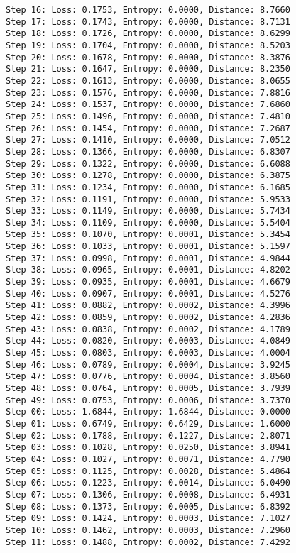 \documentclass[11pt]{article}
\begin{document}
\begin{Verbatim}[commandchars=\\\{\}]
Step 16: Loss: 0.1753, Entropy: 0.0000, Distance: 8.7660
Step 17: Loss: 0.1743, Entropy: 0.0000, Distance: 8.7131
Step 18: Loss: 0.1726, Entropy: 0.0000, Distance: 8.6299
Step 19: Loss: 0.1704, Entropy: 0.0000, Distance: 8.5203
Step 20: Loss: 0.1678, Entropy: 0.0000, Distance: 8.3876
Step 21: Loss: 0.1647, Entropy: 0.0000, Distance: 8.2350
Step 22: Loss: 0.1613, Entropy: 0.0000, Distance: 8.0655
Step 23: Loss: 0.1576, Entropy: 0.0000, Distance: 7.8816
Step 24: Loss: 0.1537, Entropy: 0.0000, Distance: 7.6860
Step 25: Loss: 0.1496, Entropy: 0.0000, Distance: 7.4810
Step 26: Loss: 0.1454, Entropy: 0.0000, Distance: 7.2687
Step 27: Loss: 0.1410, Entropy: 0.0000, Distance: 7.0512
Step 28: Loss: 0.1366, Entropy: 0.0000, Distance: 6.8307
Step 29: Loss: 0.1322, Entropy: 0.0000, Distance: 6.6088
Step 30: Loss: 0.1278, Entropy: 0.0000, Distance: 6.3875
Step 31: Loss: 0.1234, Entropy: 0.0000, Distance: 6.1685
Step 32: Loss: 0.1191, Entropy: 0.0000, Distance: 5.9533
Step 33: Loss: 0.1149, Entropy: 0.0000, Distance: 5.7434
Step 34: Loss: 0.1109, Entropy: 0.0000, Distance: 5.5404
Step 35: Loss: 0.1070, Entropy: 0.0001, Distance: 5.3454
Step 36: Loss: 0.1033, Entropy: 0.0001, Distance: 5.1597
Step 37: Loss: 0.0998, Entropy: 0.0001, Distance: 4.9844
Step 38: Loss: 0.0965, Entropy: 0.0001, Distance: 4.8202
Step 39: Loss: 0.0935, Entropy: 0.0001, Distance: 4.6679
Step 40: Loss: 0.0907, Entropy: 0.0001, Distance: 4.5276
Step 41: Loss: 0.0882, Entropy: 0.0002, Distance: 4.3996
Step 42: Loss: 0.0859, Entropy: 0.0002, Distance: 4.2836
Step 43: Loss: 0.0838, Entropy: 0.0002, Distance: 4.1789
Step 44: Loss: 0.0820, Entropy: 0.0003, Distance: 4.0849
Step 45: Loss: 0.0803, Entropy: 0.0003, Distance: 4.0004
Step 46: Loss: 0.0789, Entropy: 0.0004, Distance: 3.9245
Step 47: Loss: 0.0776, Entropy: 0.0004, Distance: 3.8560
Step 48: Loss: 0.0764, Entropy: 0.0005, Distance: 3.7939
Step 49: Loss: 0.0753, Entropy: 0.0006, Distance: 3.7370
Step 00: Loss: 1.6844, Entropy: 1.6844, Distance: 0.0000
Step 01: Loss: 0.6749, Entropy: 0.6429, Distance: 1.6000
Step 02: Loss: 0.1788, Entropy: 0.1227, Distance: 2.8071
Step 03: Loss: 0.1028, Entropy: 0.0250, Distance: 3.8941
Step 04: Loss: 0.1027, Entropy: 0.0071, Distance: 4.7790
Step 05: Loss: 0.1125, Entropy: 0.0028, Distance: 5.4864
Step 06: Loss: 0.1223, Entropy: 0.0014, Distance: 6.0490
Step 07: Loss: 0.1306, Entropy: 0.0008, Distance: 6.4931
Step 08: Loss: 0.1373, Entropy: 0.0005, Distance: 6.8392
Step 09: Loss: 0.1424, Entropy: 0.0003, Distance: 7.1027
Step 10: Loss: 0.1462, Entropy: 0.0003, Distance: 7.2960
Step 11: Loss: 0.1488, Entropy: 0.0002, Distance: 7.4292

\end{Verbatim}
\end{document}
